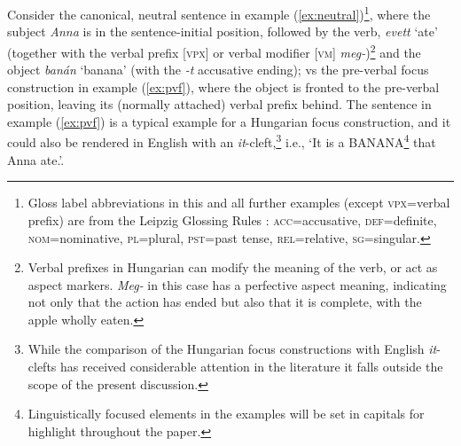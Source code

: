 \documentclass[ruler]{CUP-JNL-LIN}%
\begin{document}

Consider the canonical, neutral sentence in example (\ref{ex:neutral})\footnote{Gloss label abbreviations in this and all further examples (except \textsc{vpx}=verbal prefix) are from the Leipzig Glossing Rules \citep{comrie_2015_leipzig}: \textsc{acc}=accusative, \textsc{def}=definite, \textsc{nom}=nominative, \textsc{pl}=plural, \textsc{pst}=past tense, \textsc{rel}=relative, \textsc{sg}=singular.}, where the subject \textit{Anna} is in the sentence-initial position, followed by the verb, \textit{evett} `ate' (together with the verbal prefix [\textsc{vpx}] or verbal modifier [\textsc{vm}] \textit{meg-})\footnote{Verbal prefixes in Hungarian can modify the meaning of the verb, or act as aspect markers. \textit{Meg-} in this case has a perfective aspect meaning, indicating not only that the action has ended but also that it is complete, with the apple wholly eaten.} and the object \textit{banán} `banana' (with the \textit{-t} accusative ending); vs the pre-verbal focus construction in example (\ref{ex:pvf}), where the object is fronted to the pre-verbal position, leaving its (normally attached) verbal prefix behind. The sentence in example (\ref{ex:pvf}) is a typical example for a Hungarian focus construction, and it could also be rendered in English with an \textit{it}-cleft,\footnote{While the comparison of the Hungarian focus constructions with English \textit{it}-clefts has received considerable attention in the literature \citep[cf.][]{ekiss_1999_english,wedgwood_2006_hungarian} it falls outside the scope of the present discussion.} i.e., `It is a BANANA\footnote{Linguistically focused elements in the examples will be set in capitals for highlight throughout the paper.} that Anna ate.'.
\end{document}
